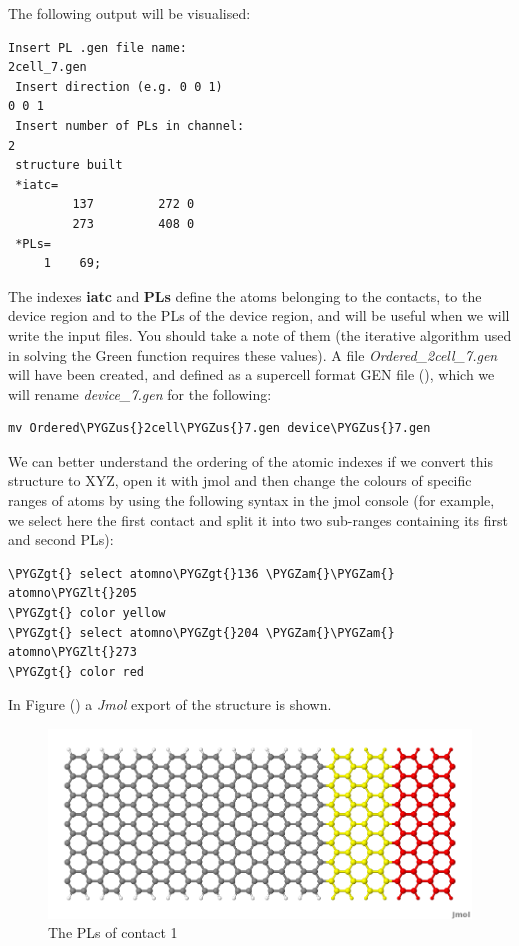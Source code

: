 \documentclass[a4paper,11pt,english]{sphinxmanual}
\def\PYGZus{\char`\_}
\def\PYGZam{\char`\&}
\def\PYGZlt{\char`\<}
\def\PYGZgt{\char`\>}
\begin{document}
{{The following output will be visualised:

\begin{Verbatim}[commandchars=\\\{\}]
 Insert PL .gen file name: 
2cell_7.gen
 Insert direction (e.g. 0 0 1)
0 0 1
 Insert number of PLs in channel: 
2
 structure built
 *iatc=
         137         272 0
         273         408 0
 *PLs=
     1    69;  
\end{Verbatim}

The indexes \textbf{iatc} and \textbf{PLs} define the atoms belonging to the
contacts, to the device region and to the PLs of the device region,
and will be useful when we will write the input files. You should take
a note of them (the iterative algorithm used in solving the Green
function requires these values). A file \emph{Ordered\_2cell\_7.gen} will
have been created, and defined as a supercell format GEN file (),
which we will rename \emph{device\_7.gen} for the following:

\begin{Verbatim}[commandchars=\\\{\}]
mv Ordered\PYGZus{}2cell\PYGZus{}7.gen device\PYGZus{}7.gen
\end{Verbatim}

We can better
understand the ordering of the atomic indexes if we convert this
structure to XYZ, open it with jmol and then change the colours of
specific ranges of atoms by using the following syntax in the jmol
console (for example, we select here the first contact and split it
into two sub-ranges containing its first and second PLs):

\begin{Verbatim}[commandchars=\\\{\}]
\PYGZgt{} select atomno\PYGZgt{}136 \PYGZam{}\PYGZam{} atomno\PYGZlt{}205
\PYGZgt{} color yellow
\PYGZgt{} select atomno\PYGZgt{}204 \PYGZam{}\PYGZam{} atomno\PYGZlt{}273
\PYGZgt{} color red
\end{Verbatim}

In Figure {\hyperref[transport:fig-color-device-7]{\emph{}}} () a \emph{Jmol} export of the structure is shown.
\begin{figure}[htbp]
\centering
\capstart

\includegraphics[width=0.800\linewidth]{color_device_7.png}
\caption{The PLs of contact 1}\label{transport:fig-color-device-7}\end{figure}

}}
\end{document}
